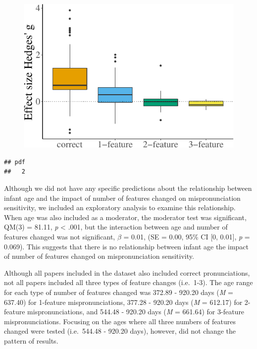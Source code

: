 \documentclass[man]{apa6}
\theoremstyle{definition}
\theoremstyle{definition}
\theoremstyle{definition}
\theoremstyle{remark}
\begin{document}
\begin{figure}[htbp]
\centering
\includegraphics{Paper_Analyses_files/figure-latex/PlotFeatEffect-1.pdf}
\caption{}
\end{figure}

\begin{verbatim}
## pdf 
##   2
\end{verbatim}

Although we did not have any specific predictions about the relationship
between infant age and the impact of number of features changed on
mispronunciation sensitivity, we included an exploratory analysis to
examine this relationship. When age was also included as a moderator,
the moderator test was significant, QM(3) = 81.11, \emph{p} \textless{}
.001, but the interaction between age and number of features changed was
not significant, \(\beta\) = 0.01, (SE = 0.00, 95\% CI {[}0, 0.01{]},
\emph{p} = 0.069). This suggests that there is no relationship between
infant age the impact of number of features changed on mispronunciation
sensitivity.

Although all papers included in the dataset also included correct
pronunciations, not all papers included all three types of feature
changes (i.e.~1-3). The age range for each type of number of features
changed was 372.89 - 920.20 days (\emph{M} = 637.40) for 1-feature
mispronunciations, 377.28 - 920.20 days (\emph{M} = 612.17) for
2-feature mispronunciations, and 544.48 - 920.20 days (\emph{M} =
661.64) for 3-feature mispronunciations. Focusing on the ages where all
three numbers of features changed were tested (i.e.~544.48 - 920.20
days), however, did not change the pattern of results.
\end{document}
